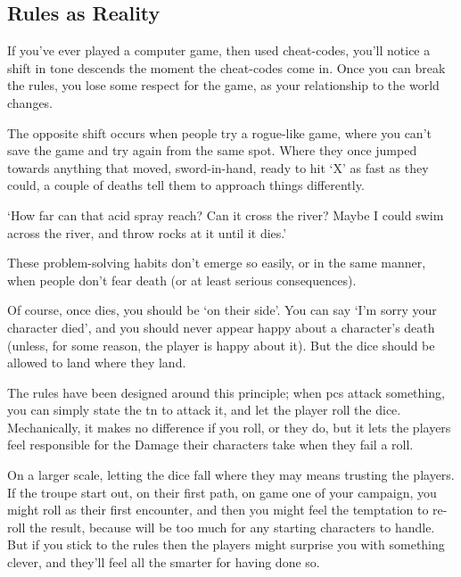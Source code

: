 \begin{multicols}{2}

\subsection{Rules as Reality}

If you've ever played a computer game, then used cheat-codes, you'll notice a shift in tone descends the moment the cheat-codes come in.
Once you can break the rules, you lose some respect for the game, as your relationship to the world changes.

The opposite shift occurs when people try a rogue-like game, where you can't save the game and try again from the same spot.
Where they once jumped towards anything that moved, sword-in-hand, ready to hit `X' as fast as they could, a couple of deaths tell them to approach things differently.

\begin{speechtext}
  `How far can that acid spray reach?
  Can it cross the river?
  Maybe I could swim across the river, and throw rocks at it until it dies.'
\end{speechtext}

These problem-solving habits don't emerge so easily, or in the same manner, when people don't fear death (or at least serious consequences).

Of course, once  dies, you should be `on their side'.
You can say `I'm sorry your character died', and you should never appear happy about a character's death (unless, for some reason, the player is happy about it).
But the dice should be allowed to land where they land.

The rules have been designed around this principle; when \glspl{pc} attack something, you can simply state the \gls{tn} to attack it, and let the player roll the dice.
Mechanically, it makes no difference if you roll, or they do, but it lets the players feel responsible for the Damage their characters take when they fail a roll.

On a larger scale, letting the dice fall where they may means trusting the players.
If the troupe start out, on their first path, on game one of your \gls{campaign}, you might roll  as their first encounter, and then you might feel the temptation to re-roll the result, because  will be too much for any starting characters to handle.
But if you stick to the rules then the players might surprise you with something clever, and they'll feel all the smarter for having done so.


\end{multicols}

